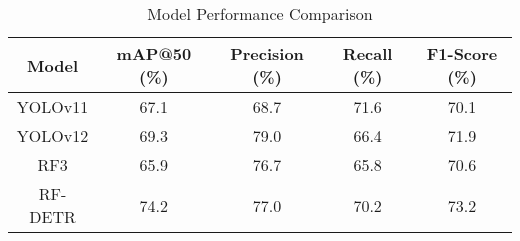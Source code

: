 \begin{table}[!ht]
\centering
\caption{Model Performance Comparison}
\label{tab:model-performance-comparison}
\footnotesize
\setlength{\tabcolsep}{6pt}
\begin{tabular}{ccccc}
\toprule
\textbf{Model} & \textbf{mAP@50 (\%)} & \textbf{Precision (\%)} & \textbf{Recall (\%)} & \textbf{F1-Score (\%)} \\
\midrule
YOLOv11  & 67.1 & 68.7 & 71.6 & 70.1 \\
YOLOv12  & 69.3 & 79.0 & 66.4 & 71.9 \\
RF3      & 65.9 & 76.7 & 65.8 & 70.6 \\
RF-DETR  & 74.2 & 77.0 & 70.2 & 73.2 \\
\bottomrule
\end{tabular}
\end{table}